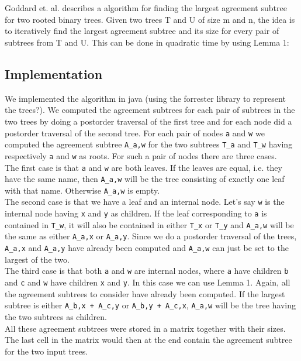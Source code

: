 \chapter{}
Goddard et. al.\cite{nsquared} describes a  algorithm for finding the largest agreement subtree for two rooted binary trees. Given two trees T and U of size m and n, the idea is to iteratively find the largest agreement subtree and its size for every pair of subtrees from T and U. This can be done in quadratic time by using Lemma 1: \todo{\dots}

\section{Implementation}
We implemented the algorithm in java (using the forrester \cite{?} library to represent the trees?). We computed the agreement subtrees for each pair of subtrees in the two trees by doing a postorder traversal of the first tree and for each node did a postorder traversal of the second tree. For each pair of nodes \texttt{a} and \texttt{w} we computed the agreement subtree \texttt{A\_a,w} for the two subtrees \texttt{T\_a} and \texttt{T\_w} having respectively \texttt{a} and \texttt{w} as roots. For such a pair of nodes there are three cases. \\
The first case is that \texttt{a} and \texttt{w} are both leaves. If the leaves are equal, i.e. they have the same name, then \texttt{A\_a,w} will be the tree consisting of exactly one leaf with that name. Otherwise \texttt{A\_a,w} is empty. \\
The second case is that we have a leaf and an internal node. Let's say \texttt{w} is the internal node having \texttt{x} and \texttt{y} as children. If the leaf corresponding to \texttt{a} is contained in \texttt{T\_w}, it will also be contained in either \texttt{T\_x} or \texttt{T\_y} and \texttt{A\_a,w} will be the same as either \texttt{A\_a,x} or \texttt{A\_a,y}. Since we do a postorder traversal of the trees, \texttt{A\_a,x} and \texttt{A\_a,y} have already been computed and \texttt{A\_a,w} can just be set to the largest of the two. \\
The third case is that both \texttt{a} and \texttt{w} are internal nodes, where \texttt{a} have children \texttt{b} and \texttt{c} and \texttt{w} have children \texttt{x} and \texttt{y}. In this case we can use Lemma 1. Again, all the agreement subtrees to consider have already been computed. If the largest subtree is either \texttt{A\_b,x + A\_c,y} or \texttt{A\_b,y + A\_c,x}, \texttt{A\_a,w} will be the tree having the two subtrees as children. \\

All these agreement subtrees were stored in a matrix together with their sizes. The last cell in the matrix would then at the end contain the agreement subtree for the two input trees.


\todo{\dots}
